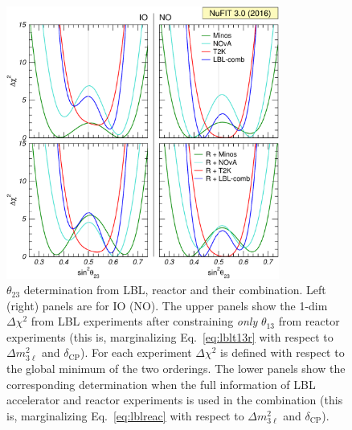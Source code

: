 \documentclass[a4paper, 11pt]{article}
\newcommand{\Dmq}{\Delta m^2}
\begin{document}
\begin{figure}\centering
  \includegraphics[width=0.8\textwidth]{fig-chisq-t23}
  \caption{$\theta_{23}$ determination from LBL, reactor and their
    combination. Left (right) panels are for IO (NO). The upper panels
    show the 1-dim $\Delta\chi^2$ from LBL experiments after
    constraining \emph{only} $\theta_{13}$ from reactor experiments
    (this is, marginalizing Eq.~\eqref{eq:lblt13r} with respect to
    $\Dmq_{3\ell}$ and $\delta_\text{CP}$). For each experiment
    $\Delta\chi^2$ is defined with respect to the global minimum of
    the two orderings.  The lower panels show the corresponding
    determination when the full information of LBL accelerator and
    reactor experiments is used in the combination (this is,
    marginalizing Eq.~\eqref{eq:lblreac} with respect to
    $\Dmq_{3\ell}$ and $\delta_\text{CP}$).}
  \label{fig:chisq-t23}
\end{figure}
\end{document}
